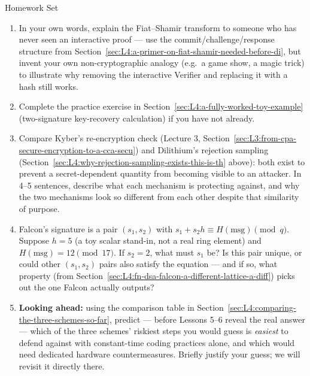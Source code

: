 \begin{exercisebox}{Homework Set}
\begin{enumerate}[leftmargin=*]
  \item In your own words, explain the Fiat--Shamir transform to someone who has never seen an interactive proof --- use the commit/challenge/response structure from Section~\ref{sec:L4:a-primer-on-fiat-shamir-needed-before-di}, but invent your own non-cryptographic analogy (e.g.\ a game show, a magic trick) to illustrate why removing the interactive Verifier and replacing it with a hash still works.
  \item Complete the practice exercise in Section~\ref{sec:L4:a-fully-worked-toy-example} (two-signature key-recovery calculation) if you have not already.
  \item Compare Kyber's re-encryption check (Lecture 3, Section~\ref{sec:L3:from-cpa-secure-encryption-to-a-cca-secu}) and Dilithium's rejection sampling (Section~\ref{sec:L4:why-rejection-sampling-exists-this-is-th} above): both exist to prevent a secret-dependent quantity from becoming visible to an attacker. In 4--5 sentences, describe what each mechanism is protecting against, and why the two mechanisms look so different from each other despite that similarity of purpose.
  \item Falcon's signature is a pair $(s_1,s_2)$ with $s_1+s_2h\equiv H(\text{msg})\pmod q$. Suppose $h = 5$ (a toy scalar stand-in, not a real ring element) and $H(\text{msg})=12 \pmod{17}$. If $s_2 = 2$, what must $s_1$ be? Is this pair unique, or could other $(s_1,s_2)$ pairs also satisfy the equation --- and if so, what property (from Section~\ref{sec:L4:fn-dsa-falcon-a-different-lattice-a-diff}) picks out the one Falcon actually outputs?
  \item \textbf{Looking ahead:} using the comparison table in Section~\ref{sec:L4:comparing-the-three-schemes-so-far}, predict --- before Lessons 5--6 reveal the real answer --- which of the three schemes' riskiest steps you would guess is \emph{easiest} to defend against with constant-time coding practices alone, and which would need dedicated hardware countermeasures. Briefly justify your guess; we will revisit it directly there.
\end{enumerate}
\end{exercisebox}
